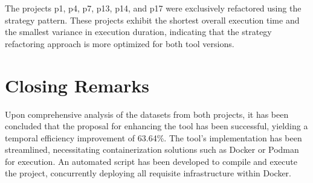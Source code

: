 The projects p1, p4, p7, p13, p14, and p17 were exclusively refactored using the strategy pattern. These projects exhibit the shortest overall execution time and the smallest variance in execution duration, indicating that the strategy refactoring approach is more optimized for both tool versions. 

\section{Closing Remarks}
\label{sec-closing-results}

Upon comprehensive analysis of the datasets from both projects, it has been concluded that the proposal for enhancing the tool has been successful, yielding a temporal efficiency improvement of 63.64\%. The tool's implementation has been streamlined, necessitating containerization solutions such as Docker or Podman for execution. An automated script has been developed to compile and execute the project, concurrently deploying all requisite infrastructure within Docker.